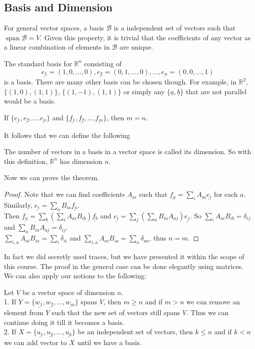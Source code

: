\subsection{Basis and Dimension}
For general vector spaces, a basis $\mathscr{B}$ is a independent set of vectors such that $\operatorname{span}\mathscr{B}=V$.
Given this property, it is trivial that the coefficients of any vector as a linear combination of elements in $\mathscr{B}$ are unique.
\begin{example}
    The standard basis for $\mathbb R^n$ consisting of
    $$\underline{e_1}=(1,0,\ldots,0),\underline{e_2}=(0,1,\ldots,0),\ldots,\underline{e_n}=(0,0,\ldots,1)$$
    is a basis.
    There are many other basis can be chosen though.
    For example, in $\mathbb R^2$, $\{(1,0),(1,1)\}$, $\{(1,-1),(1,1)\}$ or simply any $\{\underline{a},\underline{b}\}$ that are not parallel would be a basis.
\end{example}
\begin{theorem}
    If $\{\underline{e_1},\underline{e_2},\ldots.\underline{e_n}\}$ and $\{\underline{f_1},\underline{f_2},\ldots.\underline{f_m}\}$, then $m=n$.
\end{theorem}
It follows that we can define the following
\begin{definition}
    The number of vectors in a basis in a vector space is called its dimension.
    So with this definition, $\mathbb R^n$ has dimension $n$.
\end{definition}
Now we can prove the theorem.
\begin{proof}
    Note that we can find coefficients $A_{ai}$ such that $\underline{f_a}=\sum_iA_{ai}\underline{e_i}$ for each $a$.
    Similarly, $\underline{e_i}=\sum_aB_{ia}\underline{f_a}$.\\
    Then $\underline{f_a}=\sum_b(\sum_iA_{ai}B_{ib})\underline{f_b}$ and $\underline{e_i}=\sum_j(\sum_aB_{ia}A_{aj})\underline{e_j}$.
    So $\sum_iA_{ai}B_{ib}=\delta_{ij}$ and $\sum_aB_{ia}A_{aj}=\delta_{ij}$.\\
    $\sum_{i,a}A_{ai}B_{ia}=\sum_i\delta_{ii}$ and $\sum_{i,a}A_{ai}B_{ia}=\sum_a\delta_{aa}$, thus $n=m$.
\end{proof}
In fact we did secretly used traces, but we have presented it within the scope of this course.
The proof in the general case can be done elegantly using matrices.\\
We can also apply our notions to the following:
\begin{proposition}
    Let $V$ be a vector space of dimension $n$.\\
    1. If $Y=\{\underline{w_1},\underline{w_2},\ldots,\underline{w_m}\}$ spans $V$, then $m\ge n$ and if $m>n$ we can remove an element from $Y$ such that the new set of vectors still spans $V$.
    Thus we can continue doing it till it becomes a basis.\\
    2. If $X=\{\underline{u_1},\underline{u_2},\ldots,\underline{u_k}\}$ be an independent set of vectors, then $k\le n$ and if $k<n$ we can add vector to $X$ until we have a basis.
\end{proposition}
